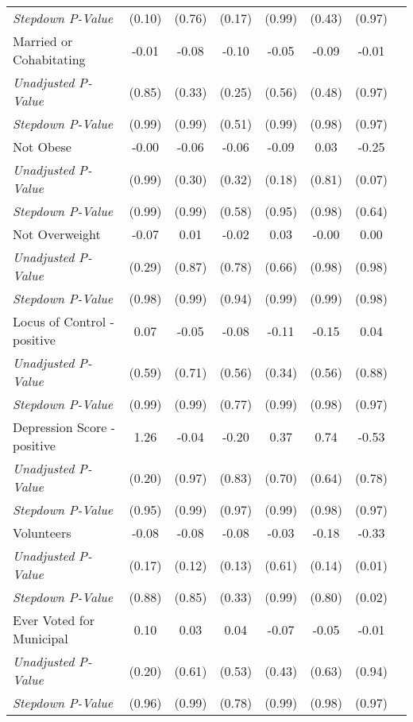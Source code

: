 \begin{tabular}{l c c c c c c c}
\quad \textit{Stepdown P-Value} & (0.10) & (0.76) & (0.17) & (0.99) & (0.43) & (0.97) \\
Married or Cohabitating & -0.01 & -0.08 & -0.10 & -0.05 & -0.09 & -0.01 \\
\quad \textit{Unadjusted P-Value} & (0.85) & (0.33) & (0.25) & (0.56) & (0.48) & (0.97) \\
\quad \textit{Stepdown P-Value} & (0.99) & (0.99) & (0.51) & (0.99) & (0.98) & (0.97) \\
Not Obese & -0.00 & -0.06 & -0.06 & -0.09 & 0.03 & -0.25 \\
\quad \textit{Unadjusted P-Value} & (0.99) & (0.30) & (0.32) & (0.18) & (0.81) & (0.07) \\
\quad \textit{Stepdown P-Value} & (0.99) & (0.99) & (0.58) & (0.95) & (0.98) & (0.64) \\
Not Overweight & -0.07 & 0.01 & -0.02 & 0.03 & -0.00 & 0.00 \\
\quad \textit{Unadjusted P-Value} & (0.29) & (0.87) & (0.78) & (0.66) & (0.98) & (0.98) \\
\quad \textit{Stepdown P-Value} & (0.98) & (0.99) & (0.94) & (0.99) & (0.99) & (0.98) \\
Locus of Control - positive & 0.07 & -0.05 & -0.08 & -0.11 & -0.15 & 0.04 \\
\quad \textit{Unadjusted P-Value} & (0.59) & (0.71) & (0.56) & (0.34) & (0.56) & (0.88) \\
\quad \textit{Stepdown P-Value} & (0.99) & (0.99) & (0.77) & (0.99) & (0.98) & (0.97) \\
Depression Score - positive & 1.26 & -0.04 & -0.20 & 0.37 & 0.74 & -0.53 \\
\quad \textit{Unadjusted P-Value} & (0.20) & (0.97) & (0.83) & (0.70) & (0.64) & (0.78) \\
\quad \textit{Stepdown P-Value} & (0.95) & (0.99) & (0.97) & (0.99) & (0.98) & (0.97) \\
Volunteers & -0.08 & -0.08 & -0.08 & -0.03 & -0.18 & -0.33 \\
\quad \textit{Unadjusted P-Value} & (0.17) & (0.12) & (0.13) & (0.61) & (0.14) & (0.01) \\
\quad \textit{Stepdown P-Value} & (0.88) & (0.85) & (0.33) & (0.99) & (0.80) & (0.02) \\
Ever Voted for Municipal & 0.10 & 0.03 & 0.04 & -0.07 & -0.05 & -0.01 \\
\quad \textit{Unadjusted P-Value} & (0.20) & (0.61) & (0.53) & (0.43) & (0.63) & (0.94) \\
\quad \textit{Stepdown P-Value} & (0.96) & (0.99) & (0.78) & (0.99) & (0.98) & (0.97) \\

\end{tabular}
